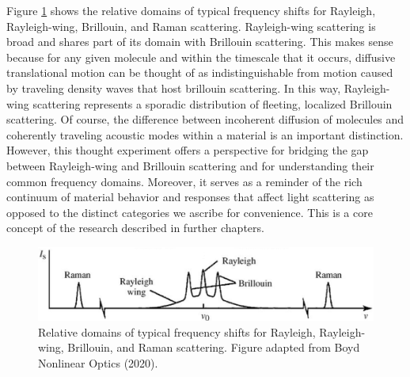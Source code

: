 Figure \ref{fig:Introduction:scattering-domains} shows the relative domains of typical frequency shifts for Rayleigh, Rayleigh-wing, Brillouin, and Raman scattering. Rayleigh-wing scattering is broad and shares part of its domain with Brillouin scattering. This makes sense because for any given molecule and within the timescale that it occurs, diffusive translational motion can be thought of as indistinguishable from motion caused by traveling density waves that host brillouin scattering. In this way, Rayleigh-wing scattering represents a sporadic distribution of fleeting, localized Brillouin scattering. Of course, the difference between incoherent diffusion of molecules and coherently traveling acoustic modes within a material is an important distinction. However, this thought experiment offers a perspective for bridging the gap between Rayleigh-wing and Brillouin scattering and for understanding their common frequency domains. Moreover, it serves as a reminder of the rich continuum of material behavior and responses that affect light scattering as opposed to the distinct categories we ascribe for convenience. This is a core concept of the research described in further chapters.%


\begin{figure}[t] %
\centering
\includegraphics[width=.65\textwidth]{figs/1-Intro/Boyd scattering frequency shift domains.png}
\caption[Relative domains of typical frequency shifts for Rayleigh, Rayleigh-wing, Brillouin, and Raman scattering.]{Relative domains of typical frequency shifts for Rayleigh, Rayleigh-wing, Brillouin, and Raman scattering. Figure adapted from Boyd Nonlinear Optics (2020). \cite{boyd2020nonlinear}}
\label{fig:Introduction:scattering-domains}
\end{figure}


